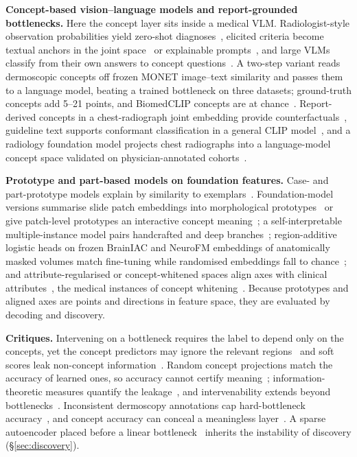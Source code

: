 \textbf{Concept-based vision--language models and report-grounded bottlenecks.} Here the concept layer
sits inside a medical VLM. Radiologist-style observation probabilities yield zero-shot
diagnoses~\cite{pellegrini2023xplainer}, elicited criteria become textual anchors in the joint
space~\cite{gao2024aligning} or explainable prompts~\cite{bie2024xcoop}, and large VLMs classify from
their own answers to concept questions~\cite{patricio2025cbvlm}. A two-step variant reads dermoscopic
concepts off frozen MONET image--text similarity and passes them to a language model, beating a trained
bottleneck on three datasets; ground-truth concepts add 5--21 points, and BiomedCLIP concepts are at
chance~\cite{patricio2025twostep}. Report-derived concepts in a chest-radiograph joint embedding provide
counterfactuals~\cite{sadashivaiah2024explaining}, guideline text supports conformant classification in
a general CLIP model~\cite{harmanani2026vision}, and a radiology foundation model projects chest
radiographs into a language-model concept space validated on physician-annotated
cohorts~\cite{han2026clear}.

\textbf{Prototype and part-based models on foundation features.} Case- and part-prototype models explain
by similarity to exemplars~\cite{chen2019thislooks,barnett2021case,kim2021xprotonet}. Foundation-model
versions summarise slide patch embeddings into morphological prototypes~\cite{song2024morphological} or
give patch-level prototypes an interactive concept meaning~\cite{huy2025interactive}; a
self-interpretable multiple-instance model pairs handcrafted and deep branches~\cite{kapse2023si};
region-additive logistic heads on frozen BrainIAC and NeuroFM embeddings of anatomically masked
volumes match fine-tuning while randomised embeddings fall to chance~\cite{zhang2026regionfm}; and
attribute-regularised or concept-whitened spaces align axes with clinical
attributes~\cite{cetin2022attri,hou2024concept}, the medical instances of concept
whitening~\cite{chen2020concept}. Because prototypes and aligned axes are points and directions in
feature space, they are evaluated by decoding and discovery.

\textbf{Critiques.} Intervening on a bottleneck requires the label to depend only on the concepts, yet
the concept predictors may ignore the relevant regions~\cite{margeloiu2021do} and soft scores leak
non-concept information~\cite{havasi2022addressing}. Random concept projections match the accuracy of
learned ones, so accuracy cannot certify meaning~\cite{srivastava2024vlg,schmalwasser2026faithfulness};
information-theoretic measures quantify the leakage~\cite{parisini2025leakage,makonnen2025measuring},
and intervenability extends beyond bottlenecks~\cite{marcinkevics2024beyond}. Inconsistent dermoscopy
annotations cap hard-bottleneck accuracy~\cite{napoles2026concept}, and concept accuracy can conceal a
meaningless layer~\cite{han2026loss}. A sparse autoencoder placed before a linear
bottleneck~\cite{rao2024discover} inherits the instability of discovery (\S\ref{sec:discovery}).

